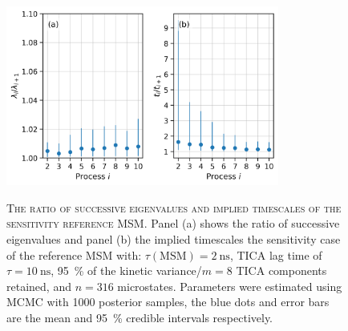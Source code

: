 

\begin{figure}[ht!]
 \centering
 \caption[The ratio of successive eigenvalues and implied timescales of the sensitivity reference MSM]{\textsc{The ratio of successive eigenvalues and implied timescales of the sensitivity reference MSM}. Panel (a) shows the ratio of successive eigenvalues and panel (b) the implied timescales the sensitivity case of the reference MSM with: $\tau(\textrm{MSM})=\SI{2}{\nano\second}$, TICA lag time of $\tau=\SI{10}{\nano\second}$, \SI{95}{\percent} of the kinetic variance/$m=8$ TICA components retained, and $n=316$ microstates. Parameters were estimated using MCMC with \num{1000} posterior samples, the blue dots and error bars are the mean and \SI{95}{\percent} credible intervals respectively.}
 \includegraphics[width=0.8\textwidth]{chapters/aadh/figures/timescale_ratios_D_sens.png}
 \label{fig:ts_ratios_d_sens}
\end{figure}

